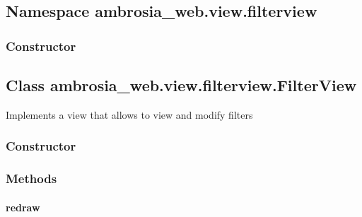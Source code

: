 \documentclass[letterpaper,10pt,english]{sphinxmanual}
\begin{document}
\subsection{Namespace ambrosia\_web.view.filterview}
\label{ambrosia_web.view.filterview:namespace-ambrosia-web-view-filterview}\label{ambrosia_web.view.filterview::doc}

\subsubsection{Constructor}
\label{ambrosia_web.view.filterview:constructor}

\begin{fulllineitems}
\label{ambrosia_web.view.filterview:ambrosia_web.view.filterview}
\end{fulllineitems}



\subsection{Class ambrosia\_web.view.filterview.FilterView}
\label{ambrosia_web.view.filterview.FilterView::doc}\label{ambrosia_web.view.filterview.FilterView:class-ambrosia-web-view-filterview-filterview}
Implements a view that allows to view and modify filters


\subsubsection{Constructor}
\label{ambrosia_web.view.filterview.FilterView:constructor}

\begin{fulllineitems}
\label{ambrosia_web.view.filterview.FilterView:ambrosia_web.view.filterview.FilterView}
\end{fulllineitems}



\subsubsection{Methods}
\label{ambrosia_web.view.filterview.FilterView:methods}

\paragraph{redraw}
\label{ambrosia_web.view.filterview.FilterView:redraw}
\end{document}
